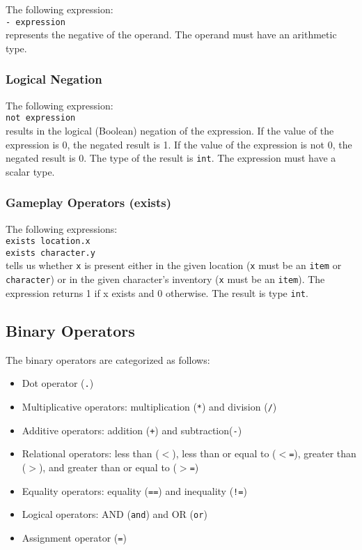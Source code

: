 \documentclass[12pt]{article}
\begin{document}
The following expression: \\

\texttt{- expression} \\

\noindent represents the negative of the operand.  The operand must have an arithmetic type.

\subsubsection{Logical Negation}

The following expression: \\

\texttt{not expression} \\

\noindent results in the logical (Boolean) negation of the expression.  If the value of the expression is 0, the negated result is 1.  If the value of the expression is not 0, the negated result is 0.  The type of the result is \texttt{int}.  The expression must have a scalar type.

\subsubsection{Gameplay Operators (exists)}
The following expressions: \\

\texttt{exists location.x} \\
\indent \texttt{exists character.y} \\

\noindent tells us whether \texttt{x} is present either in the given location (\texttt{x} must be an \texttt{item} or \texttt{character}) or in the given character's inventory (\texttt{x} must be an \texttt{item}).  The expression returns 1 if x exists and 0 otherwise.  The result is type \texttt{int}.

\subsection{Binary Operators}
The binary operators are categorized as follows:
\begin{itemize}
\item Dot operator (\texttt{.})
\item Multiplicative operators: multiplication (\texttt{*}) and division (\texttt{/})
\item Additive operators: addition (\texttt{+}) and subtraction(\texttt{-})
\item Relational operators: less than (\texttt{$<$}), less than or equal to (\texttt{$<$=}), greater than (\texttt{$>$}), and greater than or equal to (\texttt{$>$=})
\item Equality operators: equality (\texttt{==}) and inequality (\texttt{!=})
\item Logical operators: AND (\texttt{and}) and OR (\texttt{or})
\item Assignment operator (\texttt{=}) 
\end{itemize}
\end{document}
